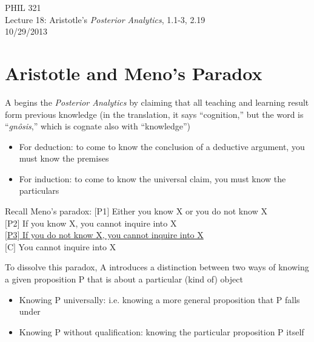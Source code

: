 \documentclass[11pt]{article}
\begin{document}
\thispagestyle{empty}
\begin{center} \LARGE{PHIL 321\\ Lecture 18: Aristotle's \emph{Posterior Analytics}, 1.1-3, 2.19}\\ \vspace*{2mm}
\large{10/29/2013}\end{center}
\thispagestyle{empty}\vspace*{3mm}
\vspace*{-8mm}

\section*{Aristotle and Meno's Paradox}

\noindent A begins the \emph{Posterior Analytics} by claiming that all teaching and learning result form previous knowledge (in the translation, it says ``cognition,'' but the word is ``\emph{gn\^{o}sis},'' which is cognate also with ``knowledge'')

\begin{itemize}\item{For deduction: to come to know the conclusion of a deductive argument, you must know the premises}\item{For induction: to come to know the universal claim, you must know the particulars}\end{itemize}

\noindent Recall Meno's paradox: $[$P1$]$ Either you know X or you do not know X\\\hspace*{35.5mm} $[$P2$]$ If you know X, you cannot inquire into X\\\hspace*{35.5mm} \underline{$[$P3$]$ If you do not know X, you cannot inquire into X}\\\hspace*{35.5mm} $[$C$]$ You cannot inquire into X
\vspace*{2mm}

\noindent To dissolve this paradox, A introduces a distinction between two ways of knowing a given proposition P that is about a particular (kind of) object

\begin{itemize}\item{Knowing P universally: i.e. knowing a more general proposition that P falls under}\item{Knowing P without qualification: knowing the particular proposition P itself}\end{itemize}
\vspace*{2mm}
\end{document}
